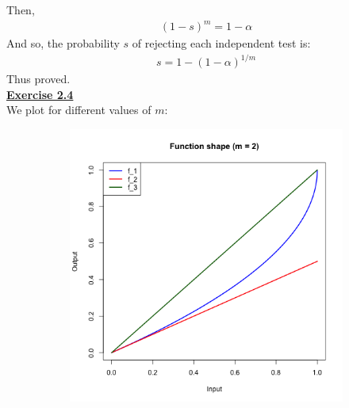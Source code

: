 \documentclass[a4paper, 11pt]{article}
\begin{document}
Then,
\begin{eqnarray}
(1-s)^m = 1 - \alpha \nonumber
\end{eqnarray}
And so, the probability $s$ of rejecting each independent test is:
\begin{eqnarray}
s = 1 - (1 - \alpha)^{1/m} \nonumber
\end{eqnarray}
Thus proved.\\
\newline \textbf{\underline{Exercise 2.4}}\\
\newline We plot for different values of $m$:
\begin{figure}[H]
\centering
\begin{subfigure}{.5\textwidth}
  \centering
  \includegraphics[width=1\linewidth]{pic2.png}
\end{subfigure}%
\begin{subfigure}{.5\textwidth}
  \centering

\end{subfigure}
\end{figure}
\end{document}
